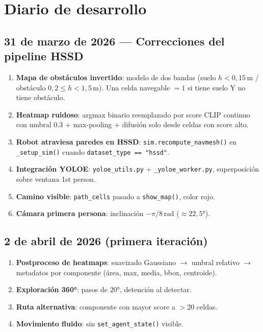 \documentclass[11pt,a4paper]{article}
\begin{document}
\section{Diario de desarrollo}

\subsection*{31 de marzo de 2026 --- Correcciones del pipeline HSSD}

\begin{enumerate}
  \item \textbf{Mapa de obstáculos invertido}: modelo de dos bandas (suelo $h<0{,}15$\,m /
        obstáculo $0{,}2 \leq h < 1{,}5$\,m). Una celda navegable $= 1$ si tiene suelo Y
        no tiene obstáculo.
  \item \textbf{Heatmap ruidoso}: argmax binario reemplazado por score CLIP continuo con
        umbral 0.3 + max-pooling + difusión solo desde celdas con score alto.
  \item \textbf{Robot atraviesa paredes en HSSD}: \texttt{sim.recompute\_navmesh()} en
        \texttt{\_setup\_sim()} cuando \texttt{dataset\_type == "hssd"}.
  \item \textbf{Integración YOLOE}: \texttt{yoloe\_utils.py} + \texttt{\_yoloe\_worker.py},
        superposición sobre ventana 1st person.
  \item \textbf{Camino visible}: \texttt{path\_cells} pasado a \texttt{show\_map()},
        color rojo.
  \item \textbf{Cámara primera persona}: inclinación $-\pi/8$\,rad ($\approx 22{,}5°$).
\end{enumerate}

\subsection*{2 de abril de 2026 (primera iteración)}

\begin{enumerate}
  \item \textbf{Postproceso de heatmaps}: suavizado Gaussiano $\rightarrow$ umbral
        relativo $\rightarrow$ metadatos por componente (área, max, media, bbox, centroide).
  \item \textbf{Exploración 360°}: pasos de 20°, detención al detectar.
  \item \textbf{Ruta alternativa}: componente con mayor score a $>$20 celdas.
  \item \textbf{Movimiento fluido}: sin \texttt{set\_agent\_state()} visible.
\end{enumerate}
\end{document}

